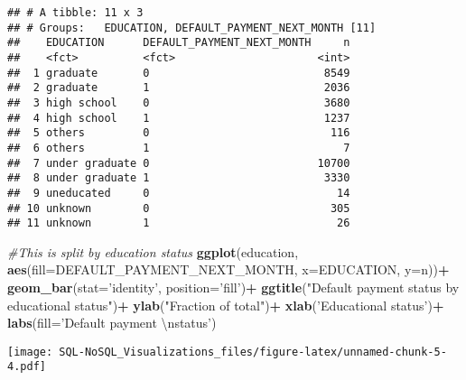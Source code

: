 \documentclass[]{article}
\newenvironment{Shaded}{\begin{snugshade}}{\end{snugshade}}
\newcommand{\KeywordTok}[1]{\textcolor[rgb]{0.13,0.29,0.53}{\textbf{#1}}}
\newcommand{\DataTypeTok}[1]{\textcolor[rgb]{0.13,0.29,0.53}{#1}}
\newcommand{\CharTok}[1]{\textcolor[rgb]{0.31,0.60,0.02}{#1}}
\newcommand{\StringTok}[1]{\textcolor[rgb]{0.31,0.60,0.02}{#1}}
\newcommand{\CommentTok}[1]{\textcolor[rgb]{0.56,0.35,0.01}{\textit{#1}}}
\newcommand{\OperatorTok}[1]{\textcolor[rgb]{0.81,0.36,0.00}{\textbf{#1}}}
\newcommand{\NormalTok}[1]{#1}
\begin{document}
\begin{verbatim}
## # A tibble: 11 x 3
## # Groups:   EDUCATION, DEFAULT_PAYMENT_NEXT_MONTH [11]
##    EDUCATION      DEFAULT_PAYMENT_NEXT_MONTH     n
##    <fct>          <fct>                      <int>
##  1 graduate       0                           8549
##  2 graduate       1                           2036
##  3 high school    0                           3680
##  4 high school    1                           1237
##  5 others         0                            116
##  6 others         1                              7
##  7 under graduate 0                          10700
##  8 under graduate 1                           3330
##  9 uneducated     0                             14
## 10 unknown        0                            305
## 11 unknown        1                             26
\end{verbatim}

\begin{Shaded}
\begin{Highlighting}[]
\CommentTok{#This is split by education status}
\KeywordTok{ggplot}\NormalTok{(education, }\KeywordTok{aes}\NormalTok{(}\DataTypeTok{fill=}\NormalTok{DEFAULT_PAYMENT_NEXT_MONTH, }\DataTypeTok{x=}\NormalTok{EDUCATION, }\DataTypeTok{y=}\NormalTok{n))}\OperatorTok{+}
\StringTok{  }\KeywordTok{geom_bar}\NormalTok{(}\DataTypeTok{stat=}\StringTok{'identity'}\NormalTok{, }\DataTypeTok{position=}\StringTok{'fill'}\NormalTok{)}\OperatorTok{+}
\StringTok{  }\KeywordTok{ggtitle}\NormalTok{(}\StringTok{"Default payment status by educational status"}\NormalTok{)}\OperatorTok{+}
\StringTok{  }\KeywordTok{ylab}\NormalTok{(}\StringTok{"Fraction of total"}\NormalTok{)}\OperatorTok{+}
\StringTok{  }\KeywordTok{xlab}\NormalTok{(}\StringTok{'Educational status'}\NormalTok{)}\OperatorTok{+}
\StringTok{  }\KeywordTok{labs}\NormalTok{(}\DataTypeTok{fill=}\StringTok{'Default payment }\CharTok{\textbackslash{}n}\StringTok{status'}\NormalTok{)}
\end{Highlighting}
\end{Shaded}

\texttt{[image: SQL-NoSQL\_Visualizations\_files/figure-latex/unnamed-chunk-5-4.pdf]}
\end{document}
